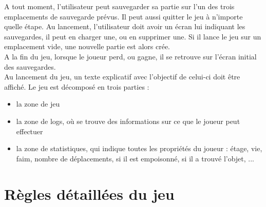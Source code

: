 \documentclass[12pt]{report}
\begin{document}
	\vspace{12pt}

	A tout moment, l'utilisateur peut sauvegarder sa partie sur l'un des trois emplacements de sauvegarde prévus. Il peut aussi quitter le jeu à n'importe quelle étape. Au lancement, l'utilisateur doit avoir un écran lui indiquant les sauvegardes, il peut en charger une, ou en supprimer une. Si il lance le jeu sur un emplacement vide, une nouvelle partie est alors crée.\\
	A la fin du jeu, lorsque le joueur perd, ou gagne, il se retrouve sur l'écran initial des sauvegardes.\\
	Au lancement du jeu, un texte explicatif avec l'objectif de celui-ci doit être affiché. Le jeu est décomposé en trois parties :
	\begin{itemize}
	\item la zone de jeu
	\item la zone de logs, où se trouve des informations sur ce que le joueur peut effectuer
	\item la zone de statistiques, qui indique toutes les propriétés du joueur : étage, vie, faim, nombre de déplacements, si il est empoisonné, si il a trouvé l'objet, ...
	\end{itemize}
	
	\section{Règles détaillées du jeu}
	
\end{document}
